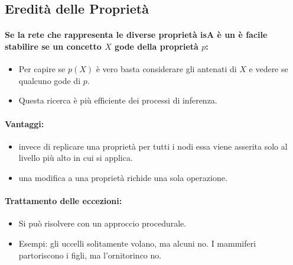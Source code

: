 \subsection{Eredità delle Proprietà}


\paragraph{Se la rete che rappresenta le diverse proprietà isA è un  è facile stabilire se un concetto $X$ gode della proprietà $p$:}

\begin{itemize}
  \item Per capire se $p(X)$ è vero basta considerare gli antenati di $X$ e vedere se qualcuno gode di $p$. 
  \item Questa ricerca è più efficiente dei processi di inferenza.
\end{itemize}

\paragraph{Vantaggi:}

\begin{itemize}
  \item {} invece di replicare una proprietà per tutti i nodi essa viene asserita solo al livello più alto in cui si applica. 
  \item {} una modifica a una proprietà richide una sola operazione.
\end{itemize}

\paragraph{Trattamento delle eccezioni:}

\begin{itemize}
  \item Si può risolvere con un approccio procedurale. 
  \item Esempi: gli uccelli solitamente volano, ma alcuni no. I mammiferi partoriscono i figli, ma l'ornitorinco no.
\end{itemize}

